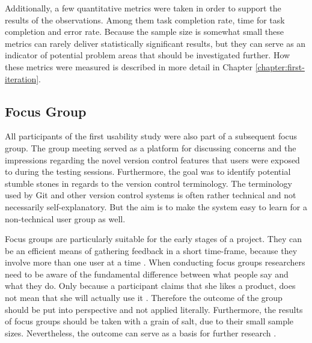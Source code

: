 Additionally, a few quantitative metrics were taken in order to support the results of the observations. Among them task completion rate, time for task completion and error rate. Because the sample size is somewhat small these metrics can rarely deliver statistically significant results, but they can serve as an indicator of potential problem areas that should be investigated further. How these metrics were measured is described in more detail in Chapter \ref{chapter:first-iteration}.








\subsection{Focus Group}
All participants of the first usability study were also part of a subsequent focus group. The group meeting served as a platform for discussing concerns and the impressions regarding the novel version control features that users were exposed to during the testing sessions. Furthermore, the goal was to identify potential stumble stones in regards to the version control terminology. The terminology used by Git and other version control systems is often rather technical and not necessarily self-explanatory. But the aim is to make the system easy to learn for a non-technical user group as well.

Focus groups are particularly suitable for the early stages of a project. They can be an efficient means of gathering feedback in a short time-frame, because they involve more than one user at a time \cite{rubin_handbook_2008,goodman_observing_2012}. When conducting focus groups researchers need to be aware of the fundamental difference between what people say and what they do. Only because a participant claims that she likes a product, does not mean that she will actually use it \cite{goodman_observing_2012}. Therefore the outcome of the group should be put into perspective and not applied literally. Furthermore, the results of focus groups should be taken with a grain of salt, due to their small sample sizes. Nevertheless, the outcome can serve as a basis for further research \cite{goodman_observing_2012}.

